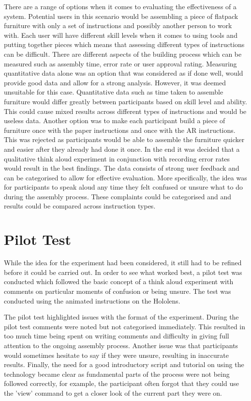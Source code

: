 \documentclass{l4proj}
\begin{document}
There are a range of options when it comes to evaluating the effectiveness of a system. Potential users in this scenario would be assembling a piece of flatpack furniture with only a set of instructions and possibly another person to work with. Each user will have different skill levels when it comes to using tools and putting together pieces which means that assessing different types of instructions can be difficult. There are different aspects of the building process which can be measured such as assembly time, error rate or user approval rating. Measuring quantitative data alone was an option that was considered as if done well, would provide good data and allow for a strong analysis. However, it was deemed unsuitable for this case. Quantitative data such as time taken to assemble furniture would differ greatly between participants based on skill level and ability. This could cause mixed results across different types of instructions and would be useless data. Another option was to make each participant build a piece of furniture once with the paper instructions and once with the AR instructions. This was rejected as participants would be able to assemble the furniture quicker and easier after they already had done it once. In the end it was decided that a qualitative think aloud experiment in conjunction with recording error rates would result in the best findings. The data consists of strong user feedback and can be categorised to allow for effective evaluation. More specifically, the idea was for participants to speak aloud any time they felt confused or unsure what to do during the assembly process. These complaints could be categorised and and results could be compared across instruction types.

\section{Pilot Test}

While the idea for the experiment had been considered, it still had to be refined before it could be carried out. In order to see what worked best, a pilot test was conducted which followed the basic concept of a think aloud experiment with comments on particular moments of confusion or being unsure. The test was conducted using the animated instructions on the Hololens.

The pilot test highlighted issues with the format of the experiment. During the pilot test comments were noted but not categorised immediately. This resulted in too much time being spent on writing comments and difficulty in giving full attention to the ongoing assembly process. Another issue was that participants would sometimes hesitate to say if they were unsure, resulting in inaccurate results. Finally, the need for a good introductory script and tutorial on using the technology became clear as fundamental parts of the process were not being followed correctly, for example, the participant often forgot that they could use the 'view' command to get a closer look of the current part they were on.
\end{document}
